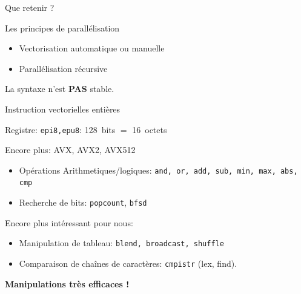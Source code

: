 \documentclass{beamer}
\begin{document}
\begin{frame}{Que retenir ?}

  \begin{NOTE}
    Les principes de parallélisation
    \begin{itemize}
    \item Vectorisation automatique ou manuelle
      \bigskip

    \item Parallélisation récursive
    \end{itemize}
  \end{NOTE}

  La syntaxe n'est \textbf{PAS} stable.
\end{frame}

\begin{frame}{Instruction vectorielles entières}

  Registre: \texttt{epi8,epu8}: 128~bits $=$ 16~octets
  \bigskip

  Encore plus: AVX, AVX2, AVX512
  \medskip

  \begin{itemize}
  \item Opérations Arithmetiques/logiques: \texttt{and, or, add, sub, min, max, abs, cmp}
  \item Recherche de bits: \texttt{popcount}, \texttt{bfsd}
  \end{itemize}
  \pause
  Encore plus intéressant pour nous:
  \begin{itemize}
  \item Manipulation de tableau: \texttt{blend, broadcast, shuffle}
  \item Comparaison de chaînes de caractères: \texttt{cmpistr} (lex, find).
  \end{itemize}
  \begin{tcolorbox}
    \centering
    \textbf{\large Manipulations très efficaces !}
  \end{tcolorbox}
\end{frame}
\end{document}
